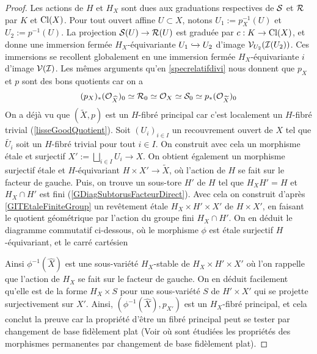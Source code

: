\begin{proof}
Les actions de $H$ et $H_X$ sont dues aux graduations respectives de $\mathcal{S}$ et $\mathcal{R}$ par $K$ et $\operatorname{Cl}(X)$. Pour tout ouvert affine $U\subset X$, notons $U_1:=p_X^{-1}(U)$ et $U_2:=p^{-1}(U)$. La projection $\mathcal{S}(U)\rightarrow \mathcal{R}(U)$ est graduée par $c:K\rightarrow \operatorname{Cl}(X)$, et donne une immersion fermée $H_X$-équivariante $U_1\xhookrightarrow{} U_2$ d'image $\mathcal{V}_{U_2}(\mathcal{I}(U_2))$. Ces immersions se recollent globalement en une immersion fermée $H_X$-équivariante $i$ d'image $\mathcal{V}(\mathcal{I})$. Les mêmes arguments qu'en \ref{specrelatifdivi} nous donnent que $p_X$ et $p$ sont des bons quotients car on a
$$(p_X)_*(\mathcal{O}_{\widehat{X}})_0\simeq \mathcal{R}_0\simeq\mathcal{O}_X\simeq\mathcal{S}_0\simeq  p_*(\mathcal{O}_{\widetilde{X}})_0$$
On a déjà vu que $(\widetilde{X},p)$ est un $H$-fibré principal car c'est localement un $H$-fibré trivial (\ref{lisseGoodQuotient}). Soit $(U_i)_{i\in I}$ un recouvrement ouvert de $X$ tel que $\widetilde{U_i}$ soit un $H$-fibré trivial pour tout $i\in I$. On construit avec cela un morphisme étale et surjectif $X':=\bigsqcup_{i\in I} U_i\rightarrow X$. On obtient également un morphisme surjectif étale et $H$-équivariant $H\times X'\rightarrow \widetilde{X}$, où l'action de $H$ se fait sur le facteur de gauche. Puis, on trouve un sous-tore $H'$ de $H$ tel que $H_XH'=H$ et $H_X\cap H'$ est fini (\ref{GDiagSubtorusFacteurDirect}). Avec cela on construit d'après \ref{GITEtaleFiniteGroup} un revêtement étale $H_X\times H'\times X'$ de $H\times X'$, en faisant le quotient géométrique par l'action du groupe fini $H_X\cap H'$. On en déduit le diagramme commutatif ci-dessous, où le morphisme $\phi$ est étale surjectif $H$-équivariant, et le carré cartésien

	\begin{center}
	\end{center}
Ainsi $\phi^{-1}(\widehat{X})$ est une sous-variété $H_X$-stable de $H_X\times H'\times X'$ où l'on rappelle que l'action de $H_X$ se fait sur le facteur de gauche. On en déduit facilement qu'elle est de la forme $H_X\times S$ pour une sous-variété $S$ de $H'\times X'$ qui se projette surjectivement sur $X'$. Ainsi, $(\phi^{-1}(\widehat{X}),p_{X'})$ est un $H_X$-fibré principal, et cela conclut la preuve car la propriété d'être un fibré principal peut se tester par changement de base fidèlement plat (Voir \cite[IV 2.7.1]{EGA} où sont étudiées les propriétés des morphismes permanentes par changement de base fidèlement plat).


\end{proof}
